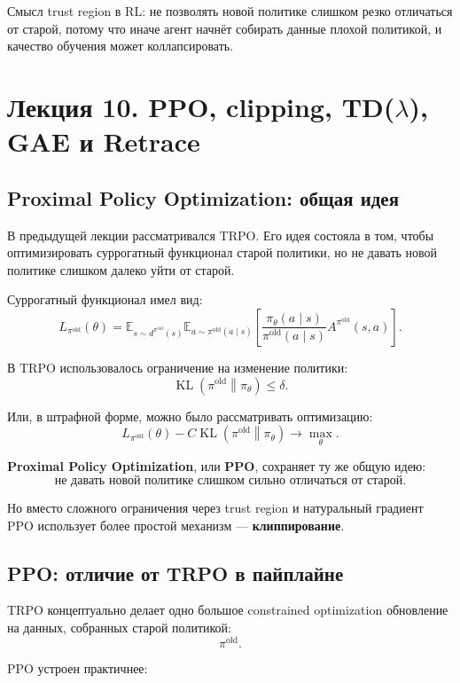 \documentclass[12pt,a4paper]{article}
\begin{document}
Смысл trust region в RL: не позволять новой политике слишком резко отличаться от старой, потому что иначе агент начнёт собирать данные плохой политикой, и качество обучения может коллапсировать.


\section{Лекция 10. PPO, clipping, TD($\lambda$), GAE и Retrace}

\subsection{Proximal Policy Optimization: общая идея}

В предыдущей лекции рассматривался TRPO. Его идея состояла в том, чтобы оптимизировать суррогатный функционал старой политики, но не давать новой политике слишком далеко уйти от старой.

Суррогатный функционал имел вид:
\[
L_{\pi^{\mathrm{old}}}(\theta)
=
\mathbb E_{s\sim d^{\pi^{\mathrm{old}}}(s)}
\mathbb E_{a\sim\pi^{\mathrm{old}}(a\mid s)}
\left[
\frac{
\pi_\theta(a\mid s)
}{
\pi^{\mathrm{old}}(a\mid s)
}
A^{\pi^{\mathrm{old}}}(s,a)
\right].
\]

В TRPO использовалось ограничение на изменение политики:
\[
\operatorname{KL}
\left(
\pi^{\mathrm{old}}
\middle\|
\pi_\theta
\right)
\le
\delta.
\]

Или, в штрафной форме, можно было рассматривать оптимизацию:
\[
L_{\pi^{\mathrm{old}}}(\theta)
-
C
\operatorname{KL}
\left(
\pi^{\mathrm{old}}
\middle\|
\pi_\theta
\right)
\to
\max_\theta.
\]

\textbf{Proximal Policy Optimization}, или \textbf{PPO}, сохраняет ту же общую идею:
\[
\text{не давать новой политике слишком сильно отличаться от старой}.
\]

Но вместо сложного ограничения через trust region и натуральный градиент PPO использует более простой механизм --- \textbf{клиппирование}.

\subsection{PPO: отличие от TRPO в пайплайне}

TRPO концептуально делает одно большое constrained optimization обновление на данных, собранных старой политикой:
\[
\pi^{\mathrm{old}}.
\]

PPO устроен практичнее:
\end{document}

